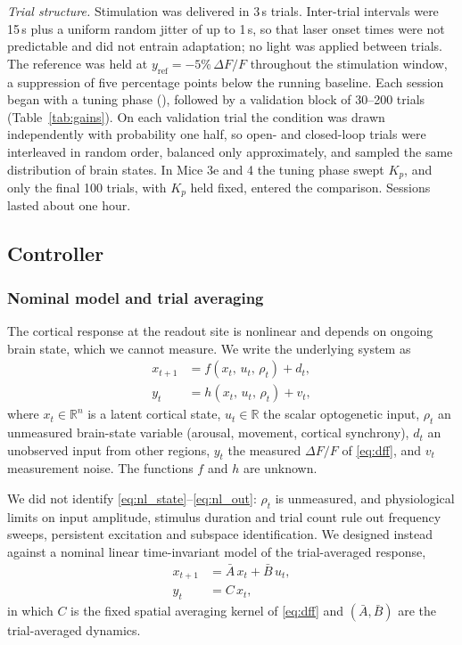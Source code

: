 \emph{Trial structure.} Stimulation was delivered in 3\,s trials. Inter-trial
intervals were 15\,s plus a uniform random jitter of up to 1\,s, so that laser
onset times were not predictable and did not entrain adaptation; no light was
applied between trials. The reference was held at
$y_{\mathrm{ref}} = -5\%\,\Delta F/F$ throughout the stimulation window, a
suppression of five percentage points below the running baseline. Each session
began with a tuning phase (), followed by a validation
block of 30--200 trials (Table~\ref{tab:gains}). On each validation trial the
condition was drawn independently with probability one half, so open- and
closed-loop trials were interleaved in random order, balanced only
approximately, and sampled the same distribution of brain states. In Mice 3e
and 4 the tuning phase swept $K_p$, and only the final 100 trials, with
$K_p$ held fixed, entered the comparison. Sessions lasted about one hour.

\subsection*{Controller}

\subsubsection*{Nominal model and trial averaging}

The cortical response at the readout site is nonlinear and depends on ongoing
brain state, which we cannot measure. We write the underlying system as
%
\begin{align}
    x_{t+1} &= f(x_{t},\,u_{t},\,\rho_{t}) + d_{t}, \label{eq:nl_state}\\
    y_{t}   &= h(x_{t},\,u_{t},\,\rho_{t}) + v_{t}, \label{eq:nl_out}
\end{align}
%
where $x_t \in \mathbb{R}^{n}$ is a latent cortical state, $u_t \in \mathbb{R}$
the scalar optogenetic input, $\rho_t$ an unmeasured brain-state variable
(arousal, movement, cortical synchrony), $d_t$ an unobserved input from other
regions, $y_t$ the measured $\Delta F/F$ of \eqref{eq:dff}, and $v_t$
measurement noise. The functions $f$ and $h$ are unknown.

We did not identify \eqref{eq:nl_state}--\eqref{eq:nl_out}: $\rho_t$ is
unmeasured, and physiological limits on input amplitude, stimulus duration
and trial count rule out frequency sweeps, persistent excitation and
subspace identification. We designed instead against a nominal
linear time-invariant model of the trial-averaged response,
%
\begin{align}
    x_{t+1} &= \bar{A}\,x_{t} + \bar{B}\,u_{t}, \label{eq:lti_state}\\
    y_{t}   &= C\,x_{t},                        \label{eq:lti_out}
\end{align}
%
in which $C$ is the fixed spatial averaging kernel of \eqref{eq:dff} and
$(\bar A, \bar B)$ are the trial-averaged dynamics.

